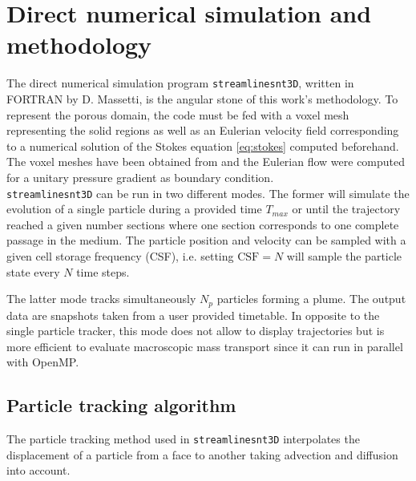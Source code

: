 \chapter{Direct numerical simulation and methodology}
The direct numerical simulation program \texttt{streamlinesnt3D}, written in \textsc{FORTRAN} by D. Massetti, is the angular stone of this work's methodology. 
To represent the porous domain, the code must be fed with a voxel mesh representing the solid regions as well as an Eulerian velocity field corresponding to a numerical solution of the Stokes equation \eqref{eq:stokes} computed beforehand.
The voxel meshes have been obtained from \citet{digitalrocksportal} and the Eulerian flow were computed for a unitary pressure gradient as boundary condition.\\
\texttt{streamlinesnt3D} can be run in two different modes.
The former will simulate the evolution of a single particle during a provided time $T_{max}$ or until the trajectory reached a given number sections where one section corresponds to one complete passage in the medium. 
The particle position and velocity can be sampled with a given cell storage frequency (CSF), i.e. setting $\mathrm{CSF}=N$ will sample the particle state every $N$ time steps. 

The latter mode tracks simultaneously $N_p$ particles forming a plume. The output data are snapshots taken from a user provided timetable. In opposite to the single particle tracker, this mode does not allow to display trajectories but is more efficient to evaluate macroscopic mass transport since it can run in parallel with OpenMP.


\section{Particle tracking algorithm}
The particle tracking method used in \texttt{streamlinesnt3D} interpolates the displacement of a particle from a face to another taking advection and diffusion into account.
 
